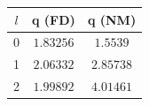 \begin{tabular}{c c c}
$l$ & q (FD) & q (NM) \\
\hline
0 & $1.83256$ & $1.5539$ \\
1 & $2.06332$ & $2.85738$ \\
2 & $1.99892$ & $4.01461$ \\
\end{tabular}
